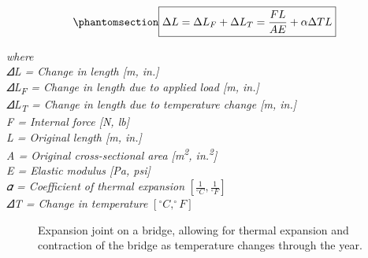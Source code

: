 \documentclass[
  letterpaper,
  DIV=11,
  numbers=noendperiod]{scrreprt}
\theoremstyle{definition}
\theoremstyle{remark}
\begin{document}
\begin{equation}\phantomsection\label{eq-5.3}{
\boxed{\Delta L=\Delta L_F+\Delta L_T=\frac{F L}{A E}+\alpha \Delta T L}
}\end{equation}

\emph{where}\\
\emph{𝛥L = Change in length {[}m, in.{]}}\\
\emph{𝛥L\textsubscript{F} = Change in length due to applied load {[}m,
in.{]}}\\
\emph{𝛥L\textsubscript{T} = Change in length due to temperature change
{[}m, in.{]}}\\
\emph{F = Internal force {[}N, lb{]}}\\
\emph{L = Original length {[}m, in.{]}}\\
\emph{A = Original cross-sectional area {[}m\textsuperscript{2},
in.\textsuperscript{2}{]}}\\
\emph{E = Elastic modulus {[}Pa, psi{]}}\\
\emph{𝛼 = Coefficient of thermal expansion}
\(\left[\frac{1}{^\circ C}, \frac{1}{^\circ F}\right]\)\\
\emph{𝛥T = Change in temperature} \([^\circ C, ^\circ F]\)

\begin{figure}


\caption{\label{fig-5.14}Expansion joint on a bridge, allowing for
thermal expansion and contraction of the bridge as temperature changes
through the year.}

\end{figure}%
\end{document}
